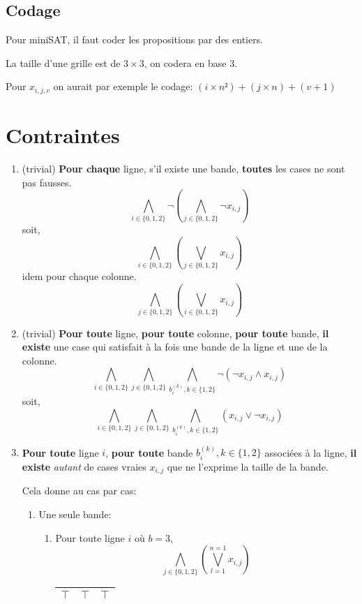 \documentclass[a4paper,12pt]{report}
\begin{document}
\subsection{Codage}
Pour miniSAT, il faut coder les propositions par des entiers.


La taille d'une grille est de $3\times3$, on codera en base 3.


Pour  $x_{i,j,v}$ on aurait par exemple le codage: $(i \times n²)+(j \times n)+(v+1)$


\section{Contraintes}
\begin{enumerate}

\item (trivial) \textbf{Pour chaque} ligne, s'il existe une bande, \textbf{toutes} les cases ne sont pas fausses.
$$ \bigwedge_{i \in \{0,1,2\}} \lnot \left( \bigwedge_{j \in \{0,1,2\}} \lnot x_{i,j} \right) $$
soit,
$$ \bigwedge_{i \in \{0,1,2\}} \left( \bigvee_{j \in \{0,1,2\}} x_{i,j} \right) $$
idem pour chaque colonne.
$$ \bigwedge_{j \in \{0,1,2\}} \left( \bigvee_{i \in \{0,1,2\}} x_{i,j} \right) $$

\item (trivial) \textbf{Pour toute} ligne, \textbf{pour toute} colonne, \textbf{pour toute} bande, \textbf{il existe} une case qui satisfait à la fois une bande de la ligne et une de la colonne.
$$\bigwedge_{i \in \{0,1,2\}} \bigwedge_{j \in \{0,1,2\}} \bigwedge_{b_i^{(k)}, k\in\{1,2\}} 
\lnot \left(
	\lnot x_{i,j} \wedge x_{i,j}
\right)$$
soit,
$$\bigwedge_{i \in \{0,1,2\}} \bigwedge_{j \in \{0,1,2\}} \bigwedge_{b_i^{(k)}, k\in\{1,2\}} 
\left(
	x_{i,j} \vee \lnot x_{i,j}
\right)$$

\item \textbf{Pour toute} ligne $i$, \textbf{pour toute} bande $b_i^{(k)}, k\in\{1,2\}$ associées à la ligne, \textbf{il existe} \textit{autant} de cases vraies $x_{i,j}$ que ne l'exprime la taille de la bande. 

Cela donne au cas par cas:
	\begin{enumerate}
		\item Une seule bande: 
		\begin{enumerate}
			\item Pour toute ligne $i$ où $b=3$, 
			$$\bigwedge_{j\in\{0,1,2\}}\left( \bigvee_{l=1}^{n=1} x_{i,j} \right)$$
			\begin{center}						
			\begin{tabular}{|c|c|c|}
			\hline 
			$\top$ & $\top$  & $\top$  \\ 
			\hline  
			\end{tabular}
			\end{center}


\end{enumerate}
\end{enumerate}
\end{enumerate}
\end{document}
